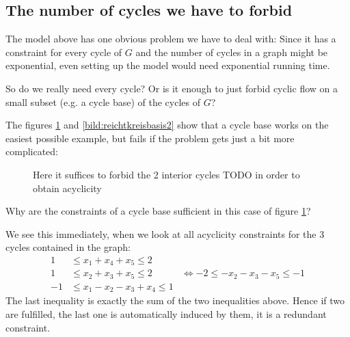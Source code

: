 \subsection{The number of cycles we have to forbid}
The model above has one obvious problem we have to deal with: Since it has a constraint for every cycle of $G$ and the 
number of cycles in a graph might be exponential, even setting up the model would need exponential running time. 

So do we really need every cycle? Or is it enough to just forbid cyclic flow on a small subset (e.g. a cycle base) of 
the cycles of $G$? 

The figures \ref{bild:reichtkreisbasis1} and \ref{bild:reichtkreisbasis2} %
show that a cycle base works on the easiest possible example, but fails if the problem gets just a bit more complicated:

\begin{figure}[h!]
\centering
{}
\caption{Here it suffices to forbid the 2 interior cycles TODO in order to obtain acyclicity}
 \label{bild:reichtkreisbasis1}
\end{figure}

Why are the constraints of a cycle base sufficient in this case of figure \ref{bild:reichtkreisbasis1}? 

We see this immediately, when we look at all acyclicity constraints for the 3 cycles contained in the graph:
\begin{align*}
 1 &\le x_1+x_4+x_5\le 2&\\
 1&\le x_2+x_3+x_5\le 2& \iff -2\le -x_2-x_3-x_5\le -1\\
 -1 &\le x_1-x_2-x_3+x_4 \le 1&
\end{align*}
The last inequality is exactly the sum of the two inequalities above. Hence if two are fulfilled, the last one is 
automatically induced by them, it is a redundant constraint.

